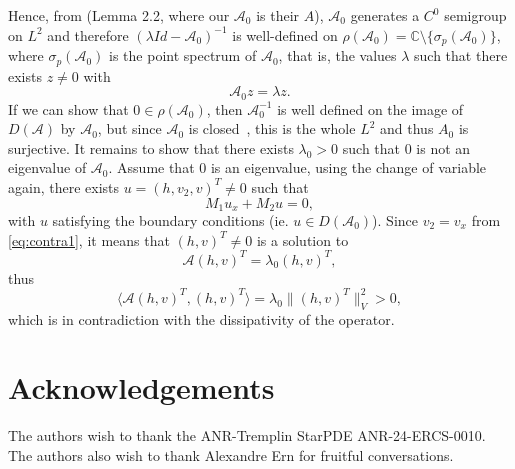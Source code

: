 \documentclass[11pt]{article}
\begin{document}
Hence, from \cite{lichtner2008spectral} (Lemma 2.2, where our $\mathcal{A}_0$ is their $A$), $\mathcal{A}_{0}$ generates a $C^{0}$ semigroup on $L^{2}$ and therefore $(\lambda Id-\mathcal{A}_{0})^{-1}$ is well-defined on $\rho(\mathcal{A}_{0}) = \mathbb{C}\setminus\{\sigma_{p}(\mathcal{A}_{0})\}$, where $\sigma_{p}(\mathcal{A}_{0})$ is the point spectrum of $\mathcal{A}_{0}$, that is, the values $\lambda$ such that there exists $z\neq 0$ with
\begin{equation}
    \mathcal{A}_{0}z = \lambda z.
\end{equation}
If we can show that $0\in \rho(\mathcal{A}_{0})$, then $\mathcal{A}_{0}^{-1}$ is well defined on the image of $D(\mathcal{A})$ by $\mathcal{A}_{0}$, but since $\mathcal{A}_{0}$ is closed~\cite{lichtner2008spectral}, this is the whole $L^{2}$ and thus $A_{0}$ is surjective. It remains to show that there exists $\lambda_{0}>0$ such that 0 is not an eigenvalue of $\mathcal{A}_{0}$. Assume that 0 is an eigenvalue, using the change of variable again, there exists $u = (h,v_{2},v)^{T}\neq 0$ such that
\begin{equation}
\label{eq:contra1}
    M_{1} u_x + M_{2} u = 0,
\end{equation}
with $u$ satisfying the boundary conditions (ie. $u \in D(\mathcal{A}_0)$). Since $v_{2}=v_{x}$ from \eqref{eq:contra1}, it means that $(h,v)^{T}\neq 0$ is a solution to
\begin{equation}
\mathcal{A}(h,v)^{T} = \lambda_{0}(h,v)^{T},
\end{equation}
thus
\begin{equation}
\langle \mathcal{A}(h,v)^{T}, (h,v)^{T}\rangle= \lambda_{0}\|(h,v)^{T}\|^{2}_{V}>0,
\end{equation}
which is in contradiction with the dissipativity of the operator.
\section*{Acknowledgements}
The authors wish to thank the ANR-Tremplin StarPDE ANR-24-ERCS-0010. The authors also wish to thank Alexandre Ern for fruitful conversations.



\end{document}
